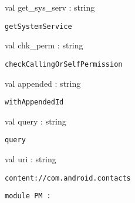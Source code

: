 \documentclass[11pt]{article}
\begin{document}
\begin{ocamldocsigend}
\begin{ocamldocdescription}
\end{ocamldocdescription}


\label{val:Android.Content.get-underscoresys-underscoreserv}\begin{ocamldoccode}
val get_sys_serv : string
\end{ocamldoccode}
\begin{ocamldocdescription}
{\tt{getSystemService}}


\end{ocamldocdescription}


\label{val:Android.Content.chk-underscoreperm}\begin{ocamldoccode}
val chk_perm : string
\end{ocamldoccode}
\begin{ocamldocdescription}
{\tt{checkCallingOrSelfPermission}}


\end{ocamldocdescription}


\label{val:Android.Content.appended}\begin{ocamldoccode}
val appended : string
\end{ocamldoccode}
\begin{ocamldocdescription}
{\tt{withAppendedId}}


\end{ocamldocdescription}


\label{val:Android.Content.query}\begin{ocamldoccode}
val query : string
\end{ocamldoccode}
\begin{ocamldocdescription}
{\tt{query}}


\end{ocamldocdescription}


\label{val:Android.Content.uri}\begin{ocamldoccode}
val uri : string
\end{ocamldoccode}
\begin{ocamldocdescription}
{\tt{content://com.android.contacts}}


\end{ocamldocdescription}


\begin{ocamldoccode}
{\tt{module }}{\tt{PM}}{\tt{ : }}\end{ocamldoccode}
\label{module:Android.Content.PM}
\begin{ocamldocsigend}



\end{ocamldocsigend}
\end{ocamldocsigend}
\end{document}

